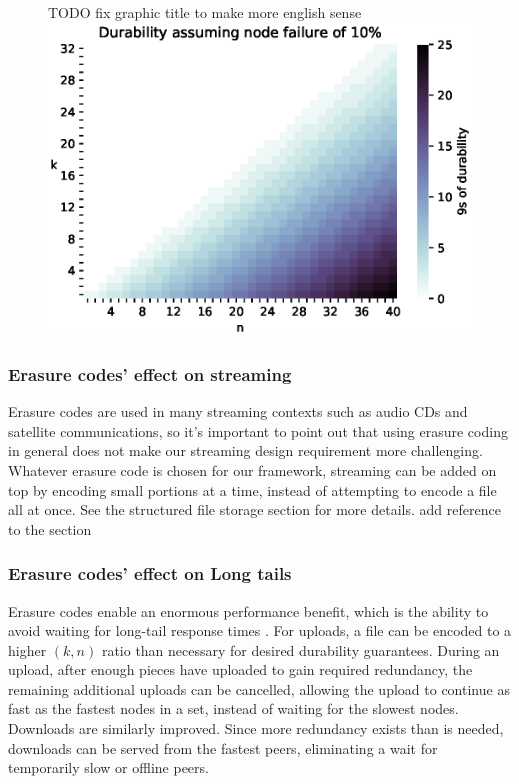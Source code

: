 \documentclass[a4paper,10pt]{article} \usepackage[utf8]{inputenc}
\newcommand{\todo}[1]{{\color{red} TODO #1 }}
\newcommand{\bs}[1]{{\color{red}#1}}
\begin{document}
{\begin{figure} \centering
\todo{fix graphic title to make more english sense}
\includegraphics[width=\linewidth]{durability/durability.eps}
\label{fig:durability}
\end{figure}

}

\subsubsection{Erasure codes' effect on streaming}

Erasure codes are used in many streaming contexts such as audio CDs and
satellite communications, so it's important to point out that using erasure
coding in general does not make our streaming design requirement more
challenging. Whatever erasure code is chosen for our framework, streaming can be
added on top by encoding small portions at a time, instead of attempting to
encode a file all at once. See the structured file storage section for more
details. \bs{add reference to the section}

\subsubsection{Erasure codes' effect on Long tails}

Erasure codes enable an enormous performance benefit, which is the ability to
avoid waiting for long-tail response times \cite{tail-at-scale}. For uploads, a
file can be encoded to a higher $(k, n)$ ratio than necessary for desired
durability
guarantees. During an upload, after enough pieces have uploaded to gain required
redundancy, the remaining additional uploads can be cancelled, allowing the
upload to continue as fast as the fastest nodes in a set, instead of waiting
for the slowest nodes.
Downloads are similarly improved. Since more redundancy exists
than is needed, downloads can be served from the fastest peers, eliminating a
wait for temporarily slow or offline peers.
\end{document}
